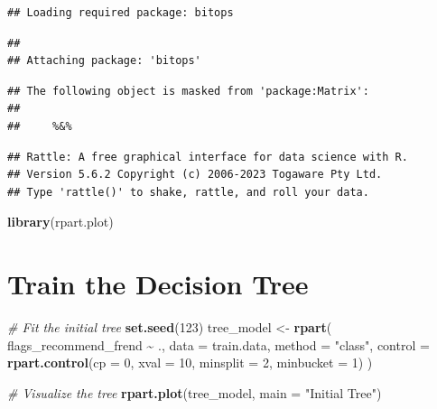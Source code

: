 \documentclass[
]{article}
\newenvironment{Shaded}{\begin{snugshade}}{\end{snugshade}}
\newcommand{\AttributeTok}[1]{\textcolor[rgb]{0.13,0.29,0.53}{#1}}
\newcommand{\CommentTok}[1]{\textcolor[rgb]{0.56,0.35,0.01}{\textit{#1}}}
\newcommand{\DecValTok}[1]{\textcolor[rgb]{0.00,0.00,0.81}{#1}}
\newcommand{\FunctionTok}[1]{\textcolor[rgb]{0.13,0.29,0.53}{\textbf{#1}}}
\newcommand{\NormalTok}[1]{#1}
\newcommand{\OtherTok}[1]{\textcolor[rgb]{0.56,0.35,0.01}{#1}}
\newcommand{\SpecialCharTok}[1]{\textcolor[rgb]{0.81,0.36,0.00}{\textbf{#1}}}
\newcommand{\StringTok}[1]{\textcolor[rgb]{0.31,0.60,0.02}{#1}}
\begin{document}
\begin{verbatim}
## Loading required package: bitops
\end{verbatim}

\begin{verbatim}
## 
## Attaching package: 'bitops'
\end{verbatim}

\begin{verbatim}
## The following object is masked from 'package:Matrix':
## 
##     %&%
\end{verbatim}

\begin{verbatim}
## Rattle: A free graphical interface for data science with R.
## Version 5.6.2 Copyright (c) 2006-2023 Togaware Pty Ltd.
## Type 'rattle()' to shake, rattle, and roll your data.
\end{verbatim}

\begin{Shaded}
\begin{Highlighting}[]
\FunctionTok{library}\NormalTok{(rpart.plot)}
\end{Highlighting}
\end{Shaded}

\section{Train the Decision Tree}\label{train-the-decision-tree}

\begin{Shaded}
\begin{Highlighting}[]
\CommentTok{\# Fit the initial tree}
\FunctionTok{set.seed}\NormalTok{(}\DecValTok{123}\NormalTok{)}
\NormalTok{tree\_model }\OtherTok{\textless{}{-}} \FunctionTok{rpart}\NormalTok{(}
\NormalTok{  flags\_recommend\_frend }\SpecialCharTok{\textasciitilde{}}\NormalTok{ .,}
  \AttributeTok{data =}\NormalTok{ train.data,}
  \AttributeTok{method =} \StringTok{"class"}\NormalTok{, }
  \AttributeTok{control =} \FunctionTok{rpart.control}\NormalTok{(}\AttributeTok{cp =} \DecValTok{0}\NormalTok{, }\AttributeTok{xval =} \DecValTok{10}\NormalTok{, }\AttributeTok{minsplit =} \DecValTok{2}\NormalTok{, }\AttributeTok{minbucket =} \DecValTok{1}\NormalTok{)}
\NormalTok{)}

\CommentTok{\# Visualize the tree}
\FunctionTok{rpart.plot}\NormalTok{(tree\_model, }\AttributeTok{main =} \StringTok{"Initial Tree"}\NormalTok{)}
\end{Highlighting}
\end{Shaded}
\end{document}
